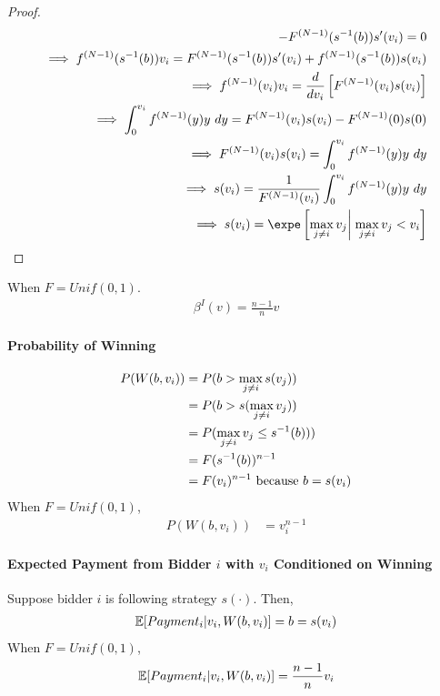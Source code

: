 \documentclass{article}
\begin{document}
\begin{proof}
\begin{align}
			- F^{(N-1)}(s^{-1}(b)) s'(v_i) = 0 \\
			\implies f^{(N-1)}(s^{-1}(b)) v_i = F^{(N-1)}(s^{-1}(b)) s'(v_i) + f^{(N-1)}(s^{-1}(b)) s(v_i) \\
			\implies f^{(N-1)}(v_i) v_i = \frac{d}{dv_i} \left[ F^{(N-1)}(v_i) s(v_i) \right] \\
			\implies \int_{0}^{v_i} f^{(N-1)}(y) y\ dy = F^{(N-1)}(v_i) s(v_i) - F^{(N-1)}(0) s(0) \\
			\implies F^{(N-1)}(v_i) s(v_i) = \int_{0}^{v_i} f^{(N-1)}(y) y\ dy \\
			\implies s(v_i) = \frac{1}{F^{(N-1)}(v_i)} \int_{0}^{v_i} f^{(N-1)}(y) y\ dy \\
			\implies s(v_i) = \expe \left[\max_{j \neq i} v_j \right|\left. \max_{j \neq i} v_j < v_i \right]
		\end{align}
	\end{proof}
	When $F = Unif(0, 1)$.
	\begin{align}
		\beta^I(v) = \frac{n-1}{n} v
	\end{align}
	
	\paragraph{Probability of Winning}
	\begin{align}
		P(W(b, v_i))
		&= P(b > \max_{j \neq i} s(v_j)) \\
		&= P(b > s(\max_{j \neq i} v_j)) \\
		&= P(\max_{j \neq i} v_j \leq s^{-1}(b))) \\
		&= F(s^{-1}(b))^{n-1} \\
		&= F(v_i)^{n-1} \text{{ because }} b = s(v_i)
	\end{align}
	When $F = Unif(0, 1)$,
	\begin{align}
		P(W(b, v_i)) &= v_i^{n-1}
	\end{align} 
	
	\paragraph{Expected Payment from Bidder $i$ with $v_i$ Conditioned on Winning} Suppose bidder $i$ is following strategy $s(\cdot)$. Then,
	\begin{align}
		\mathbb{E}[{Payment_i|v_i, W(b, v_i)}] = b = s(v_i)
	\end{align}
	When $F = Unif(0, 1)$,
	\begin{align}
		\mathbb{E}[{Payment_i|v_i, W(b, v_i)}] = \frac{n-1}{n} v_i
	\end{align}
	
\end{document}
